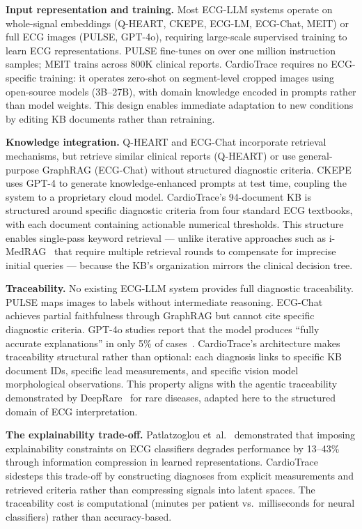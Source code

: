 \documentclass[journal,compsoc]{IEEEtran}
\newcommand{\system}{CardioTrace}
\begin{document}
\textbf{Input representation and training.} Most ECG-LLM systems operate on whole-signal embeddings (Q-HEART, CKEPE, ECG-LM, ECG-Chat, MEIT) or full ECG images (PULSE, GPT-4o), requiring large-scale supervised training to learn ECG representations. PULSE fine-tunes on over one million instruction samples; MEIT trains across 800K clinical reports. \system{} requires no ECG-specific training: it operates zero-shot on segment-level cropped images using open-source models (3B--27B), with domain knowledge encoded in prompts rather than model weights. This design enables immediate adaptation to new conditions by editing KB documents rather than retraining.

\textbf{Knowledge integration.} Q-HEART and ECG-Chat incorporate retrieval mechanisms, but retrieve similar clinical reports (Q-HEART) or use general-purpose GraphRAG (ECG-Chat) without structured diagnostic criteria. CKEPE uses GPT-4 to generate knowledge-enhanced prompts at test time, coupling the system to a proprietary cloud model. \system{}'s 94-document KB is structured around specific diagnostic criteria from four standard ECG textbooks, with each document containing actionable numerical thresholds. This structure enables single-pass keyword retrieval --- unlike iterative approaches such as i-MedRAG~\cite{imedrag2025} that require multiple retrieval rounds to compensate for imprecise initial queries --- because the KB's organization mirrors the clinical decision tree.

\textbf{Traceability.} No existing ECG-LLM system provides full diagnostic traceability. PULSE maps images to labels without intermediate reasoning. ECG-Chat achieves partial faithfulness through GraphRAG but cannot cite specific diagnostic criteria. GPT-4o studies report that the model produces ``fully accurate explanations'' in only 5\% of cases~\cite{lee2025ecg_mi}. \system{}'s architecture makes traceability structural rather than optional: each diagnosis links to specific KB document IDs, specific lead measurements, and specific vision model morphological observations. This property aligns with the agentic traceability demonstrated by DeepRare~\cite{deeprare2025} for rare diseases, adapted here to the structured domain of ECG interpretation.

\textbf{The explainability trade-off.} Patlatzoglou et~al.~\cite{explainability_cost_2025} demonstrated that imposing explainability constraints on ECG classifiers degrades performance by 13--43\% through information compression in learned representations. \system{} sidesteps this trade-off by constructing diagnoses from explicit measurements and retrieved criteria rather than compressing signals into latent spaces. The traceability cost is computational (minutes per patient vs.\ milliseconds for neural classifiers) rather than accuracy-based.
\end{document}
